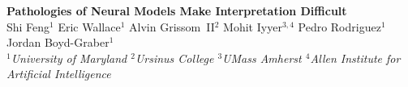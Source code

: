 \documentclass[a0,portrait]{a0poster}
\begin{document}


\begin{minipage}[b]{1\linewidth}
\centering
\veryHuge \color{blue} \textbf{Pathologies of Neural Models Make Interpretation Difficult} \\[0.4cm]
\color{black}\LARGE
Shi Feng$^1$ Eric Wallace$^1$ Alvin Grissom~II$^2$ Mohit Iyyer$^{3,4}$ Pedro Rodriguez$^1$ Jordan Boyd-Graber$^1$\\[0.4cm]
\Large
\textit{$^1$University of Maryland $^2$Ursinus College $^3$UMass Amherst $^4$Allen Institute for Artificial Intelligence}\\
\end{minipage}

\vspace{0.3cm}
\end{document}
